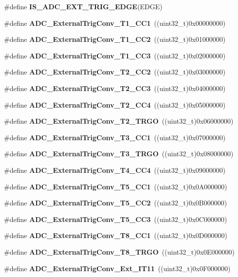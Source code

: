 \begin{DoxyCompactItemize}
\#define \textbf{ I\+S\+\_\+\+A\+D\+C\+\_\+\+E\+X\+T\+\_\+\+T\+R\+I\+G\+\_\+\+E\+D\+GE}(E\+D\+GE)
\item 
\#define \textbf{ A\+D\+C\+\_\+\+External\+Trig\+Conv\+\_\+\+T1\+\_\+\+C\+C1}~((uint32\+\_\+t)0x00000000)
\item 
\#define \textbf{ A\+D\+C\+\_\+\+External\+Trig\+Conv\+\_\+\+T1\+\_\+\+C\+C2}~((uint32\+\_\+t)0x01000000)
\item 
\#define \textbf{ A\+D\+C\+\_\+\+External\+Trig\+Conv\+\_\+\+T1\+\_\+\+C\+C3}~((uint32\+\_\+t)0x02000000)
\item 
\#define \textbf{ A\+D\+C\+\_\+\+External\+Trig\+Conv\+\_\+\+T2\+\_\+\+C\+C2}~((uint32\+\_\+t)0x03000000)
\item 
\#define \textbf{ A\+D\+C\+\_\+\+External\+Trig\+Conv\+\_\+\+T2\+\_\+\+C\+C3}~((uint32\+\_\+t)0x04000000)
\item 
\#define \textbf{ A\+D\+C\+\_\+\+External\+Trig\+Conv\+\_\+\+T2\+\_\+\+C\+C4}~((uint32\+\_\+t)0x05000000)
\item 
\#define \textbf{ A\+D\+C\+\_\+\+External\+Trig\+Conv\+\_\+\+T2\+\_\+\+T\+R\+GO}~((uint32\+\_\+t)0x06000000)
\item 
\#define \textbf{ A\+D\+C\+\_\+\+External\+Trig\+Conv\+\_\+\+T3\+\_\+\+C\+C1}~((uint32\+\_\+t)0x07000000)
\item 
\#define \textbf{ A\+D\+C\+\_\+\+External\+Trig\+Conv\+\_\+\+T3\+\_\+\+T\+R\+GO}~((uint32\+\_\+t)0x08000000)
\item 
\#define \textbf{ A\+D\+C\+\_\+\+External\+Trig\+Conv\+\_\+\+T4\+\_\+\+C\+C4}~((uint32\+\_\+t)0x09000000)
\item 
\#define \textbf{ A\+D\+C\+\_\+\+External\+Trig\+Conv\+\_\+\+T5\+\_\+\+C\+C1}~((uint32\+\_\+t)0x0\+A000000)
\item 
\#define \textbf{ A\+D\+C\+\_\+\+External\+Trig\+Conv\+\_\+\+T5\+\_\+\+C\+C2}~((uint32\+\_\+t)0x0\+B000000)
\item 
\#define \textbf{ A\+D\+C\+\_\+\+External\+Trig\+Conv\+\_\+\+T5\+\_\+\+C\+C3}~((uint32\+\_\+t)0x0\+C000000)
\item 
\#define \textbf{ A\+D\+C\+\_\+\+External\+Trig\+Conv\+\_\+\+T8\+\_\+\+C\+C1}~((uint32\+\_\+t)0x0\+D000000)
\item 
\#define \textbf{ A\+D\+C\+\_\+\+External\+Trig\+Conv\+\_\+\+T8\+\_\+\+T\+R\+GO}~((uint32\+\_\+t)0x0\+E000000)
\item 
\#define \textbf{ A\+D\+C\+\_\+\+External\+Trig\+Conv\+\_\+\+Ext\+\_\+\+I\+T11}~((uint32\+\_\+t)0x0\+F000000)
\item 

\end{DoxyCompactItemize}
